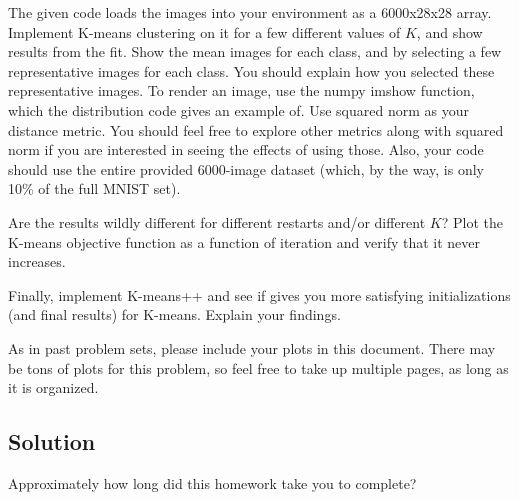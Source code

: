 \documentclass[submit]{harvardml}
\begin{document}
\begin{problem}
The given code loads the images into your environment as a 6000x28x28 array.
Implement K-means clustering on it for a few different values of $K$, and show
results from the fit. Show the mean images for each class, and by selecting a
few representative images for each class. You should explain how you selected
these representative images. To render an image, use the numpy imshow function,
which the distribution code gives an example of. Use squared norm as your
distance metric. You should feel free to explore other metrics along with
squared norm if you are interested in seeing the effects of using those. Also,
your code should use the entire provided 6000-image dataset (which, by the way,
is only 10\% of the full MNIST set).

Are the results wildly different for different restarts and/or different $K$?
Plot the K-means objective function as a function of iteration and verify that
it never increases.

Finally, implement K-means++ and see if gives you more satisfying
initializations (and final results) for K-means. Explain your findings.

As in past problem sets, please include your plots in this document. There may
be tons of plots for this problem, so feel free to take up multiple pages, as
long as it is organized.
\end{problem}
\subsection*{Solution}




\newpage
\begin{problem}[Calibration, 1pt]
Approximately how long did this homework take you to complete?
\end{problem}
\end{document}
